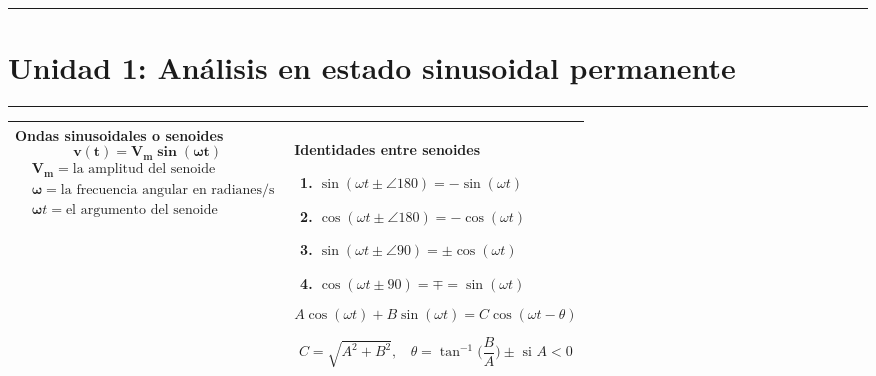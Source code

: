 \documentclass[../main.tex]{subfiles}
\begin{document}
\everymath{\displaystyle}
\renewcommand{\arraystretch}{1.4}
\hrule
\vspace*{-\baselineskip}
\vspace{0.05in}
\section{Unidad 1: Análisis en estado sinusoidal permanente}
\hrule
\begin{xltabular}{\textwidth}{|X|X|}
	\toprule
	\textbf{\large Ondas sinusoidales o senoides}
	$$\bm{v(t)=V_m\sin(\omega t)}$$
	$\begin{aligned}
			 & \bm{V_m} = \text{la amplitud del senoide}                \\
			 & \bm{\omega} = \text{la frecuencia angular en radianes/s} \\
			 & \bm{\omega} t = \text{el argumento del senoide}
	\end{aligned}$
	\newline\newline
	
	
	
	&
	\large\textbf{Identidades entre senoides}

	\begin{enumerate}
		\item $\sin(\omega t \pm\angle{180}) = -\sin(\omega t)$
		\item $\cos(\omega t \pm\angle{180})=-\cos(\omega t)$
		\item $\sin(\omega t \pm \angle{90})=\pm \cos(\omega t)$
		\item $\cos(\omega t \pm 90) = \mp = \sin(\omega t)$
	\end{enumerate}

	$$A\cos(\omega t) + B\sin(\omega t) = C \cos(\omega t-\theta)$$
	
	$$C = \sqrt{A^2 +B^2},~~~~\theta =\tan^{-1}\bigg(\frac{B}{A}\bigg)\pm \text{ si } A < 0$$
	
	

	

	

	

	
	\\
	\hline
\end{xltabular}
\end{document}
